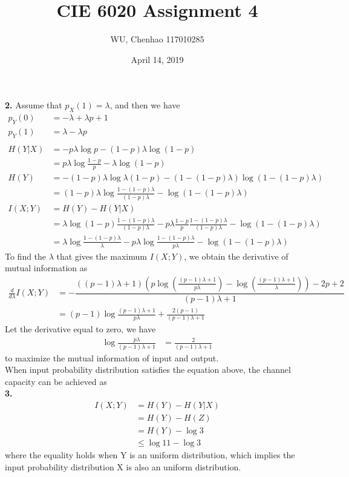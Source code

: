 \documentclass[12pt]{article}
\author{WU, Chenhao  117010285}
\title{CIE 6020 Assignment 4}
\date{April 14, 2019}
\begin{document}
	\maketitle
	\textbf{2.} Assume that $p_X(1) = \lambda$, and then we have
		\begin{align*}
			p_Y(0) &= - \lambda + \lambda p + 1 \\
			p_Y(1) &= \lambda - \lambda p \\
			\\
			H(Y|X) &= -p\lambda\log p-(1-p)\lambda\log(1-p) \\
				   &= p\lambda\log\frac{1-p}{p} - \lambda\log(1-p) \\
			H(Y)   &= -(1-p)\lambda\log\lambda(1-p) - (1- (1-p)\lambda)\log(1-(1-p)\lambda) \\
				   &= (1-p)\lambda\log\frac{1-(1-p)\lambda}{(1-p)\lambda} - \log(1-(1-p)\lambda) \\
			I(X;Y) &= H(Y) - H(Y|X) \\
				   &= \lambda\log (1-p)\frac{1-(1-p)\lambda}{(1-p)\lambda} - p\lambda \frac{1-p}{p} \frac{1-(1-p)\lambda}{(1-p)\lambda}	- \log(1-(1-p)\lambda) \\
				   &= \lambda\log\frac{1-(1-p)\lambda}{\lambda} - p\lambda \log\frac{1-(1-p)\lambda}{p\lambda} - \log(1-(1-p)\lambda) 
		\end{align*}
		To find the $\lambda$ that gives the maximum $I(X;Y)$, we obtain the derivative of mutual information as
		\begin{align*}
			\frac{d}{d\lambda} I(X;Y) &= -\dfrac{\left(\left(p-1\right)\lambda+1\right)\left(p\log\left(\frac{\left(p-1\right)\lambda+1}{p\lambda}\right)-\log\left(\frac{\left(p-1\right)\lambda+1}{\lambda}\right)\right)-2p+2}{\left(p-1\right)\lambda+1}  \\
			&= (p-1)\log\frac{(p-1)\lambda+1}{p\lambda} + \frac{2(p-1)}{(p-1)\lambda+1} 
		\end{align*}
		Let the derivative equal to zero, we have 
		\begin{align*}
			\log\frac{p\lambda}{(p-1)\lambda+1} &= \frac{2}{(p-1)\lambda+1} 
		\end{align*}
		to maximize the mutual information of input and output. \\
		When input probability distribution satisfies the equation above, the channel capacity can be achieved as \\
	
	\textbf{3.} 
	\begin{align*}
		I(X;Y) &= H(Y) - H(Y|X) \\
			   &= H(Y) - H(Z) \\
			   &= H(Y) - \log 3 \\
			   &\leq \log 11 - \log 3
	\end{align*}
	where the equality holds when Y is an uniform distribution, which implies the input probability distribution X is also an uniform distribution.\\
	
\end{document}
